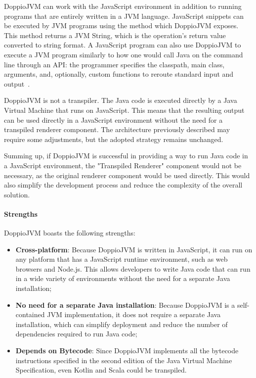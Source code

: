 DoppioJVM can work with the JavaScript environment in addition to running programs that are entirely written in a JVM language. JavaScript snippets can be executed by JVM programs using the  method which DoppioJVM exposes. This method returns a JVM String, which is the operation's return value converted to string format. A JavaScript program can also use DoppioJVM to execute a JVM program similarly to how one would call Java on the command line through an API: the programmer specifies the classpath, main class, arguments, and, optionally, custom functions to reroute standard input and output~\cite{doppio}.\newline

DoppioJVM is not a transpiler. The Java code is executed directly by a Java Virtual Machine that runs on JavaScript. This means that the resulting output can be used directly in a JavaScript environment without the need for a transpiled renderer component. The architecture previously described may require some adjustments, but the adopted strategy remains unchanged.\newline

Summing up, if DoppioJVM is successful in providing a way to run Java code in a JavaScript environment, the "Transpiled Renderer" component would not be necessary, as the original renderer component would be used directly. This would also simplify the development process and reduce the complexity of the overall solution.

\paragraph{Strengths} DoppioJVM boasts the following strengths:
\begin{itemize}
	\item \textbf{Cross-platform}: Because DoppioJVM is written in JavaScript, it can run on any platform that has a JavaScript runtime environment, such as web browsers and Node.js. This allows developers to write Java code that can run in a wide variety of environments without the need for a separate Java installation;
	\item \textbf{No need for a separate Java installation}: Because DoppioJVM is a self-contained JVM implementation, it does not require a separate Java installation, which can simplify deployment and reduce the number of dependencies required to run Java code;
	\item \textbf{Depends on Bytecode}: Since DoppioJVM implements all the bytecode instructions specified in the second edition of the Java Virtual Machine Specification, even Kotlin and Scala could be transpiled.
\end{itemize}
